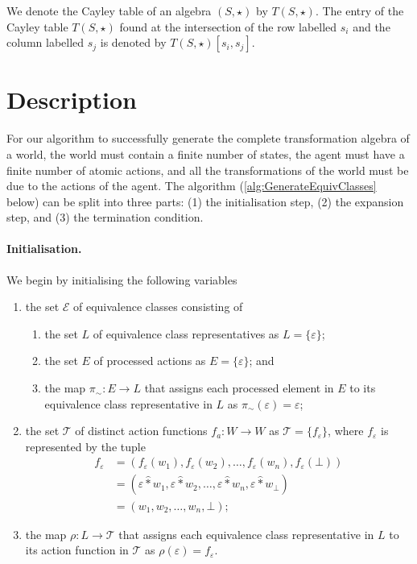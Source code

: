 \begin{notation}
    We denote the Cayley table of an algebra $(S, \star)$ by $T(S, \star)$.
    The entry of the Cayley table $T(S, \star)$ found at the intersection of the row labelled $s_{i}$ and the column labelled $s_{j}$ is denoted by $T(S, \star)[s_{i}, s_{j}]$.
\end{notation}

\section{Description}

For our algorithm to successfully generate the complete transformation algebra of a world, the world must contain a finite number of states, the agent must have a finite number of atomic actions, and all the transformations of the world must be due to the actions of the agent.
The algorithm (\cref{alg:GenerateEquivClasses} below) can be split into three parts: (1) the initialisation step, (2) the expansion step, and (3) the termination condition.

\paragraph{Initialisation.}
We begin by initialising the following variables
\begin{enumerate}
    \item the set $\mathcal{E}$ of equivalence classes consisting of
    \begin{enumerate}
        \item the set $L$ of equivalence class representatives as $L = \{ \varepsilon \}$;
        \item the set $E$ of processed actions as $E = \{ \varepsilon \}$; and
        \item the map $\pi_{\sim}: E \to L$ that assigns each processed element in $E$ to its equivalence class representative in $L$ as $\pi_{\sim}(\varepsilon) = \varepsilon$;
    \end{enumerate}
    \item the set $\mathcal{T}$ of distinct action functions $f_{a}: W \to W$ as $\mathcal{T} = \{f_{\varepsilon}\}$, where $f_{\varepsilon}$ is represented by the tuple
    \begin{align}
        f_{\varepsilon} & = (f_{\varepsilon}(w_{1}), f_{\varepsilon}(w_{2}), \dots, f_{\varepsilon}(w_{n}), f_{\varepsilon}(\bot)) \\
        & = (\varepsilon \hat{\ast} w_{1}, \varepsilon \hat{\ast} w_{2}, \dots, \varepsilon \hat{\ast} w_{n}, \varepsilon \hat{\ast} w_{\bot}) \\
        & = (w_{1}, w_{2}, \dots, w_{n}, \bot);
    \end{align}
    \item the map $\rho: L \to \mathcal{T}$ that assigns each equivalence class representative in $L$ to its action function in $\mathcal{T}$ as $\rho(\varepsilon) = f_{\varepsilon}$.
\end{enumerate}


